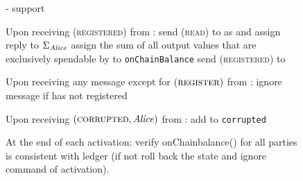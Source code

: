 \begin{figure}[H]
\begin{systembox}{\fpaynet - support}
\begin{algorithmic}[1]
      \State Upon receiving (\textsc{registered}) from \alice:
      \Indent
        \State send (\textsc{read}) to \ledger{} as \alice{} and assign reply to
        $\Sigma_{\mathit{Alice}}$
        \State assign the sum of all output values that are exclusively
        spendable by \alice{} to \texttt{onChainBalance}
        \State send (\textsc{registered}) to \alice
      \EndIndent
      \State

      \State Upon receiving any message except for
      $\left(\textsc{register}\right)$ from \alice:
      \Indent
        \State ignore message if \alice{} has not registered
      \EndIndent
      \State

      \State Upon receiving $\left(\textsc{corrupted}, \mathit{Alice}\right)$ from
      \simulator:
      \Indent
        \State add \alice{} to \texttt{corrupted}
      \EndIndent
      \State

      \State At the end of each activation: 
      \Indent
        \State verify onChainbalance() for all parties is consistent with ledger
        (if not roll back the state and ignore command of activation).
      \EndIndent
    \end{algorithmic}
  \end{systembox}
  \caption{}
  \label{alg:fpaynet:support}
\end{figure}

